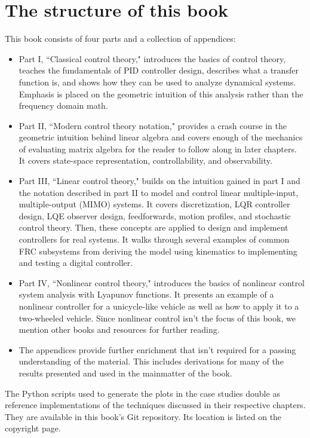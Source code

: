 \section{The structure of this book}

This book consists of four parts and a collection of appendices:

\begin{itemize}
  \item Part I, ``Classical control theory," introduces the basics of control
    theory, teaches the fundamentals of PID controller design, describes what a
    transfer function is, and shows how they can be used to analyze dynamical
    systems. Emphasis is placed on the geometric intuition of this analysis
    rather than the frequency domain math.
  \item Part II, ``Modern control theory notation," provides a crash course in
    the geometric intuition behind linear algebra and covers enough of the
    mechanics of evaluating matrix algebra for the reader to follow along in
    later chapters. It covers state-space representation, controllability, and
    observability.
  \item Part III, ``Linear control theory," builds on the intuition gained in
    part I and the notation described in part II to model and control linear
    multiple-input, multiple-output (MIMO) systems. It covers discretization,
    LQR controller design, LQE observer design, feedforwards, motion profiles,
    and stochastic control theory. Then, these concepts are applied to design
    and implement controllers for real systems. It walks through several
    examples of common FRC subsystems from deriving the model using kinematics
    to implementing and testing a digital controller.
  \item Part IV, ``Nonlinear control theory," introduces the basics of nonlinear
    control system analysis with Lyapunov functions. It presents an example of a
    nonlinear controller for a unicycle-like vehicle as well as how to apply it
    to a two-wheeled vehicle. Since nonlinear control isn't the focus of this
    book, we mention other books and resources for further reading.
  \item The appendices provide further enrichment that isn't required for a
    passing understanding of the material. This includes derivations for many of
    the results presented and used in the mainmatter of the book.
\end{itemize}

The Python scripts used to generate the plots in the case studies double as
reference implementations of the techniques discussed in their respective
chapters. They are available in this book's Git repository. Its location is
listed on the copyright page.

